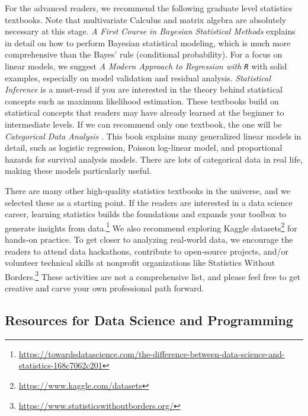 \documentclass[
]{article}
\begin{document}
For the advanced readers, we recommend the following graduate level
statistics textbooks. Note that multivariate Calculus and matrix algebra
are absolutely necessary at this stage. \emph{A First Course in Bayesian
Statistical Methods} \citep{hoff2009first} explains in detail on how to
perform Bayesian statistical modeling, which is much more comprehensive
than the Bayes' rule (conditional probability). For a focus on linear
models, we suggest \emph{A Modern Approach to Regression with
\texttt{R}} \citep{sheather2009modern} with solid examples, especially
on model validation and residual analysis. \emph{Statistical Inference}
\citep{casella2021statistical} is a must-read if you are interested in
the theory behind statistical concepts such as maximum likelihood
estimation. These textbooks build on statistical concepts that readers
may have already learned at the beginner to intermediate levels. If we
can recommend only one textbook, the one will be \emph{Categorical Data
Analysis} \citep{agresti2003categorical}. This book explains many
generalized linear models in detail, such as logistic regression,
Poisson log-linear model, and proportional hazards for survival analysis
models. There are lots of categorical data in real life, making these
models particularly useful.

There are many other high-quality statistics textbooks in the universe,
and we selected these as a starting point. If the readers are interested
in a data science career, learning statistics builds the foundations and
expands your toolbox to generate insights from data.\footnote{\url{https://towardsdatascience.com/the-difference-between-data-science-and-statistics-168c7062c201}}
We also recommend exploring Kaggle datasets\footnote{\url{https://www.kaggle.com/datasets}}
for hands-on practice. To get closer to analyzing real-world data, we
encourage the readers to attend data hackathons, contribute to
open-source projects, and/or volunteer technical skills at nonprofit
organizations like Statistics Without Borders.\footnote{\url{https://www.statisticswithoutborders.org/}}
These activities are not a comprehensive list, and please feel free to
get creative and carve your own professional path forward.

\hypertarget{learning-data-science}{%
\subsection{Resources for Data Science and
Programming}\label{learning-data-science}}
\end{document}
